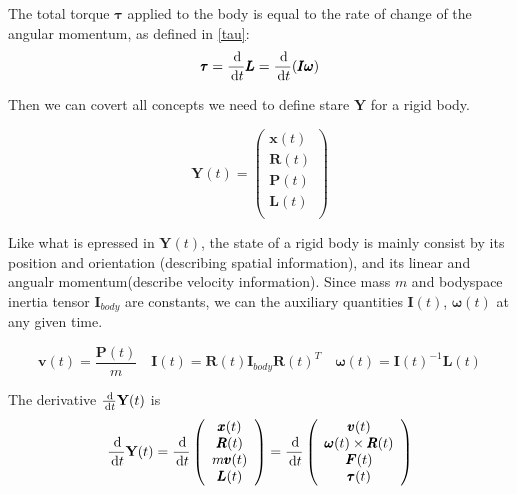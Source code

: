 The total torque $\pmb{\tau}$ applied to the body is equal to the rate of change of the angular momentum, as defined in \ref{tau}:
\begin{equation}
    \pmb{\tau} = \frac{\,\mathrm{d}}{\,\mathrm{d} t }\pmb{L} = \frac{\,\mathrm{d}}{\,\mathrm{d} t }(\pmb{I}\pmb{\omega})
    \label{tau}
\end{equation}

 Then we can covert all concepts we need to define stare $\textbf{Y}$ for a rigid body.

\begin{equation}
    \textbf{Y}(t) = \left(
        \begin{array}{c}
            \pmb{x}(t) \\
            \pmb{R}(t) \\
            \pmb{P}(t) \\
            \pmb{L}(t) \\
        \end{array}
    \right)
\end{equation}

Like what is epressed in $\textbf{Y}(t)$, the state of a rigid body is mainly consist by its position and orientation (describing spatial information), and its linear and angualr momentum(describe velocity information). Since mass $m$ and bodyspace inertia tensor $\pmb{I}_{body}$ are constants, we can the auxiliary quantities $\pmb{I}(t)$, $\pmb{\omega}(t)$ at any given time.

\begin{equation}
    \pmb{v}(t) = \frac{\pmb{P}(t)}{m} \quad
    \pmb{I}(t) = \pmb{R}(t)\pmb{I}_{body}\pmb{R}(t)^{T} \quad
    \pmb{\omega}(t) = \pmb{I}(t)^{-1}\pmb{L}(t)
\end{equation}

The derivative $\frac{\,\mathrm{d}}{\,\mathrm{d} t}\textbf{Y}(t)$ is
\begin{equation}
    \frac{\,\mathrm{d}}{\,\mathrm{d}{t}}\textbf{Y}(t) = \frac{\,\mathrm{d}}{\,\mathrm{d} t}\left(
        \begin{array}{c}
            \pmb{x}(t) \\
            \pmb{R}(t) \\
            m \pmb{v}(t) \\
            \pmb{L}(t) \\
        \end{array}
    \right) = \frac{\,\mathrm{d}}{\,\mathrm{d} t}\left(
        \begin{array}{c}
            \pmb{v}(t) \\
            \pmb{\omega}(t)\times\pmb{R}(t) \\
            \pmb{F}(t) \\
            \pmb{\tau}(t) \\
        \end{array}
    \right)
\end{equation}

